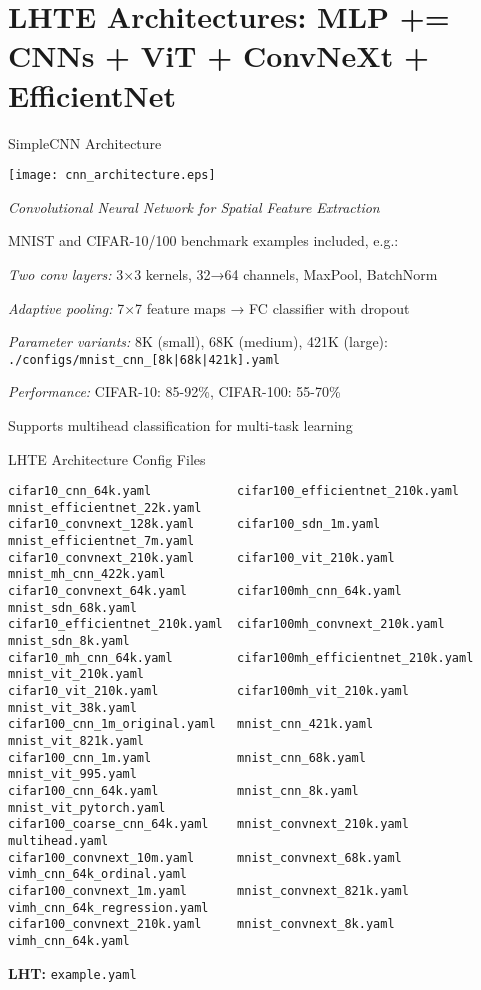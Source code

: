 \section[toc={New Architectures}]{LHTE Architectures: MLP += \\
  CNNs + ViT + ConvNeXt + EfficientNet}

\begin{slidewhite}[\slideopts,toc={CNN}]{SimpleCNN Architecture}
  
  \centerline{\texttt{[image: cnn\_architecture.eps]}}

  \emph{Convolutional Neural Network for Spatial Feature Extraction}
  
  \begin{itemize}
    \mpitem MNIST and CIFAR-10/100 benchmark examples included, e.g.:

    \mpitem \emph{Two conv layers:} 3×3 kernels, 32→64 channels, MaxPool, BatchNorm
    
    \mpitem \emph{Adaptive pooling:} 7×7 feature maps → FC classifier with dropout
    
    \mpitem \emph{Parameter variants:} 8K (small), 68K (medium), 421K (large):\\
    \texttt{./configs/mnist\_cnn\_[8k|68k|421k].yaml}
    
    \mpitem \emph{Performance:} CIFAR-10: 85-92\%, CIFAR-100: 55-70\%
    
    \mpitem Supports multihead classification for multi-task learning
  \end{itemize}
  
\end{slidewhite}

\begin{wideslide}[\slideopts,toc={YAML},method=direct]{LHTE Architecture Config Files}
{\footnotesize
\begin{verbatim}
cifar10_cnn_64k.yaml            cifar100_efficientnet_210k.yaml    mnist_efficientnet_22k.yaml
cifar10_convnext_128k.yaml      cifar100_sdn_1m.yaml               mnist_efficientnet_7m.yaml
cifar10_convnext_210k.yaml      cifar100_vit_210k.yaml             mnist_mh_cnn_422k.yaml
cifar10_convnext_64k.yaml       cifar100mh_cnn_64k.yaml            mnist_sdn_68k.yaml
cifar10_efficientnet_210k.yaml  cifar100mh_convnext_210k.yaml      mnist_sdn_8k.yaml
cifar10_mh_cnn_64k.yaml         cifar100mh_efficientnet_210k.yaml  mnist_vit_210k.yaml
cifar10_vit_210k.yaml           cifar100mh_vit_210k.yaml           mnist_vit_38k.yaml
cifar100_cnn_1m_original.yaml   mnist_cnn_421k.yaml                mnist_vit_821k.yaml
cifar100_cnn_1m.yaml            mnist_cnn_68k.yaml                 mnist_vit_995.yaml
cifar100_cnn_64k.yaml           mnist_cnn_8k.yaml                  mnist_vit_pytorch.yaml
cifar100_coarse_cnn_64k.yaml    mnist_convnext_210k.yaml           multihead.yaml
cifar100_convnext_10m.yaml      mnist_convnext_68k.yaml            vimh_cnn_64k_ordinal.yaml
cifar100_convnext_1m.yaml       mnist_convnext_821k.yaml           vimh_cnn_64k_regression.yaml
cifar100_convnext_210k.yaml     mnist_convnext_8k.yaml             vimh_cnn_64k.yaml
\end{verbatim}
}
\textbf{LHT:} \; \texttt{example.yaml}
\end{wideslide}

